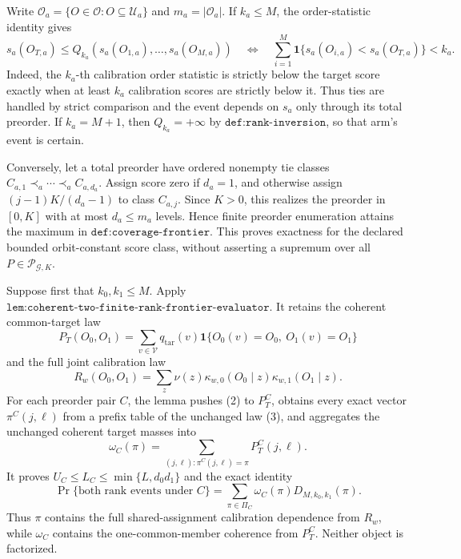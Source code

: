 Write \(\mathcal O_a=\{O\in\mathcal O:O\subseteq\mathcal U_a\}\) and \(m_a=|\mathcal O_a|\). If \(k_a\le M\), the order-statistic identity gives
\[
s_a(O_{T,a})\le Q_{k_a}(s_a(O_{1,a}),\ldots,s_a(O_{M,a}))\quad\Longleftrightarrow\quad\sum_{i=1}^M\mathbf 1\{s_a(O_{i,a})<s_a(O_{T,a})\}<k_a. \tag{1}
\]
Indeed, the \(k_a\)-th calibration order statistic is strictly below the target score exactly when at least \(k_a\) calibration scores are strictly below it. Thus ties are handled by strict comparison and the event depends on \(s_a\) only through its total preorder. If \(k_a=M+1\), then \(Q_{k_a}=+\infty\) by \(\texttt{def:rank-inversion}\), so that arm's event is certain.

Conversely, let a total preorder have ordered nonempty tie classes \(C_{a,1}\prec_a\cdots\prec_a C_{a,d_a}\). Assign score zero if \(d_a=1\), and otherwise assign \((j-1)K/(d_a-1)\) to class \(C_{a,j}\). Since \(K>0\), this realizes the preorder in \([0,K]\) with at most \(d_a\le m_a\) levels. Hence finite preorder enumeration attains the maximum in \(\texttt{def:coverage-frontier}\). This proves exactness for the declared bounded orbit-constant score class, without asserting a supremum over all \(P\in\mathcal P_{\mathcal G,K}\).

Suppose first that \(k_0,k_1\le M\). Apply \(\texttt{lem:coherent-two-finite-rank-frontier-evaluator}\). It retains the coherent common-target law
\[
P_T(O_0,O_1)=\sum_{v\in\mathcal V}q_{\mathrm{tar}}(v)\mathbf 1\{O_0(v)=O_0,\ O_1(v)=O_1\} \tag{2}
\]
and the full joint calibration law
\[
R_w(O_0,O_1)=\sum_z\nu(z)\kappa_{w,0}(O_0\mid z)\kappa_{w,1}(O_1\mid z). \tag{3}
\]
For each preorder pair \(C\), the lemma pushes (2) to \(P_T^C\), obtains every exact vector \(\pi^C(j,\ell)\) from a prefix table of the unchanged law (3), and aggregates the unchanged coherent target masses into
\[
\omega_C(\pi)=\sum_{(j,\ell):\pi^C(j,\ell)=\pi}P_T^C(j,\ell). \tag{4}
\]
It proves \(U_C\le L_C\le\min\{L,d_0d_1\}\) and the exact identity
\[
\Pr\{\text{both rank events under }C\}=\sum_{\pi\in\Pi_C}\omega_C(\pi)D_{M,k_0,k_1}(\pi). \tag{5}
\]
Thus \(\pi\) contains the full shared-assignment calibration dependence from \(R_w\), while \(\omega_C\) contains the one-common-member coherence from \(P_T^C\). Neither object is factorized.

